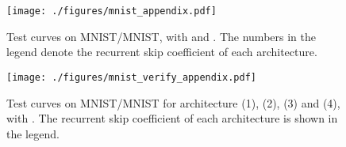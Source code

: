 \begin{figure}[htp]
\center
\texttt{[image: ./figures/mnist\_appendix.pdf]}
\vspace{-10pt}
\caption{Test curves on MNIST/MNIST, with  and . The numbers in the legend
denote the recurrent skip coefficient  of each architecture.}
\label{fig:mnist_ex}
\end{figure}




\begin{figure}[htp]
\center
\texttt{[image: ./figures/mnist\_verify\_appendix.pdf]}
\vspace{-10pt}
\caption{Test curves on MNIST/MNIST for architecture (1), (2), (3) and (4), with .
The recurrent skip coefficient  of each architecture is shown in the legend.}
\label{fig:verify_ex}
\end{figure}




{\small 


}
\appendix



